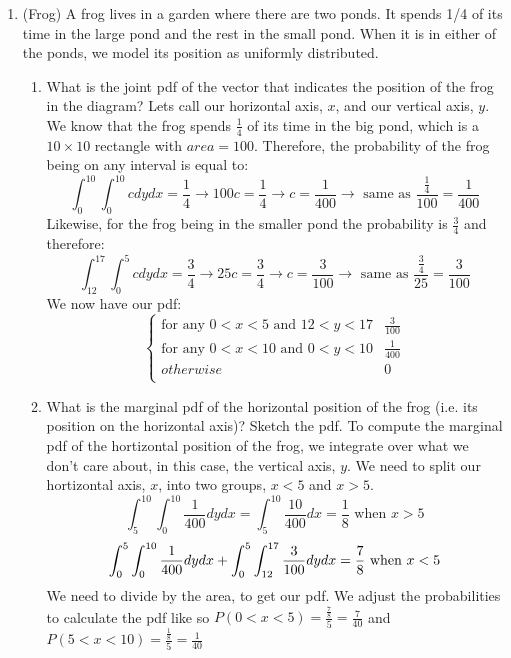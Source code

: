 \documentclass[12pt,twoside]{article}
\begin{document}
\begin{enumerate}
\item (Frog)
A frog lives in a garden where there are two ponds. It spends 1/4 of its time in the large pond and the rest in the small pond. When it is in either of the ponds, we model its position as uniformly distributed. 
\begin{enumerate}
\item What is the joint pdf of the vector that indicates the position of the frog in the diagram?
\subitem
Lets call our horizontal axis, $x$, and our vertical axis, $y$. We know that the frog spends $\frac{1}{4}$ of its time in the big pond, which is a $10\times10$ rectangle with $area=100$. Therefore, the probability of the frog being on any interval is equal to:
$$
    \int_0^{10} \int_0^{10} cdydx = \frac{1}{4} \rightarrow 100c = \frac{1}{4} \rightarrow c = \frac{1}{400} \rightarrow \text{ same as }\frac{\frac{1}{4}}{100} = \frac{1}{400}
$$
Likewise, for the frog being in the smaller pond the probability is $\frac{3}{4}$ and therefore:
$$
    \int_{12}^{17} \int_0^5 cdydx = \frac{3}{4} \rightarrow 25c = \frac{3}{4} \rightarrow c = \frac{3}{100} \rightarrow \text{ same as }\frac{\frac{3}{4}}{25} = \frac{3}{100}
$$
We now have our pdf:
$$
    \begin{cases}
    \text{for any } 0 < x < 5 \text{ and } 12 < y < 17 & \frac{3}{100}\\
    \text{for any } 0 < x < 10 \text{ and } 0 < y < 10 & \frac{1}{400}\\
    otherwise & 0\\
    \end{cases}
$$

\item What is the marginal pdf of the horizontal position of the frog (i.e. its position on the horizontal axis)? Sketch the pdf. 
\subitem
To compute the marginal pdf of the hortizontal position of the frog, we integrate over what we don't care about, in this case, the vertical axis, $y$. We need to split our hortizontal axis, $x$, into two groups, $x<5$ and $x>5$.
$$
    \int_5^{10} \int_0^{10}\frac{1}{400}dydx = \int_{5}^{10}\frac{10}{400}dx = \frac{1}{8} \text{ when } x>5$$ 
$$
    \int_{0}^5 \int_0^{10}\frac{1}{400}dydx + \int_0^5 \int_{12}^{17} \frac{3}{100}dydx = \frac{7}{8} \text{ when } x < 5 \\ 
$$
We need to divide by the area, to get our pdf. 
We adjust the probabilities to calculate the pdf like so $P(0<x<5) = \frac{\frac{7}{8}}{5}=\frac{7}{40}$ and $P(5<x<10)=\frac{\frac{1}{8}}{5}=\frac{1}{40}$\\


\end{enumerate}
\end{enumerate}
\end{document}
